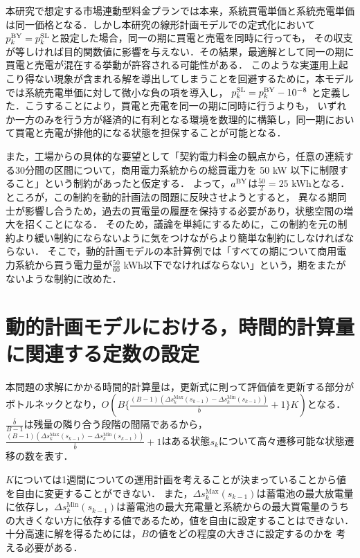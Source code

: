 本研究で想定する市場連動型料金プランでは本来，系統買電単価と系統売電単価は同一価格となる．しかし本研究の線形計画モデルでの定式化において
$p_k^{\rm BY} = p_k^{\rm SL} $と設定した場合，同一の期に買電と売電を同時に行っても，
その収支が等しければ目的関数値に影響を与えない．その結果，最適解として同一の期に買電と売電が混在する挙動が許容される可能性がある．
このような実運用上起こり得ない現象が含まれる解を導出してしまうことを回避するために，本モデルでは系統売電単価に対して微小な負の項を導入し，
$p_k^{\rm SL}=p_k^{\rm BY} - 10^{-8}$
と定義した．こうすることにより，買電と売電を同一の期に同時に行うよりも，
いずれか一方のみを行う方が経済的に有利となる環境を数理的に構築し，同一期において買電と売電が排他的になる状態を担保することが可能となる．

また，工場からの具体的な要望として「契約電力料金の観点から，任意の連続する30分間の区間について，商用電力系統からの総買電力を 50 kW 以下に制限すること」という制約があったと仮定する．
よって，$a^{\rm BY}$は$\frac{50}{2}=25$ kWhとなる．
ところが，この制約を動的計画法の問題に反映させようとすると，
 異なる期同士が影響し合うため，過去の買電量の履歴を保持する必要があり，状態空間の増大を招くことになる．
 そのため，議論を単純にするために，この制約を元の制約より緩い制約にならないように気をつけながらより簡単な制約にしなければならない．
そこで，動的計画モデルの本計算例では「すべての期について商用電力系統から買う電力量が$\frac{50}{60}$ kWh以下でなければならない」という，期をまたがないような制約に改めた．


\section{動的計画モデルにおける，時間的計算量に関連する定数の設定}
本問題の求解にかかる時間的計算量は，更新式に則って評価値を更新する部分がボトルネックとなり，$O(B\{ \frac{(B-1)(\Delta s_k^{\mathrm{Max}}(s_{k-1}) - \Delta s_k^{\mathrm{Min}}(s_{k-1}) )}{\overline{b}} +1\} K)$となる．$\frac{\overline{b}}{B-1}$は残量の隣り合う段階の間隔であるから，
 $\frac{(B-1)(\Delta s_k^{\mathrm{Max}}(s_{k-1}) - \Delta s_k^{\mathrm{Min}}(s_{k-1}) )}{\overline{b}} +1$はある状態$s_k$について高々遷移可能な状態遷移の数を表す．
 
$K$については1週間についての運用計画を考えることが決まっていることから値を自由に変更することができない．
また，$\Delta s_k^{\mathrm{Max}}(s_{k-1})$は蓄電池の最大放電量に依存し，$\Delta s_k^{\mathrm{Min}}(s_{k-1}) $は蓄電池の最大充電量と系統からの最大買電量のうちの大きくない方に依存する値であるため，値を自由に設定することはできない．
十分高速に解を得るためには，$B$の値をどの程度の大きさに設定するのかを
考える必要がある． 


